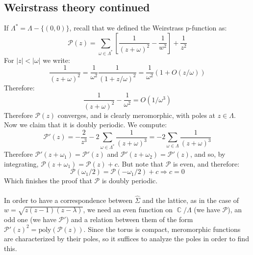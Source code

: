 \documentclass[12 pt]{article}
\DeclareMathOperator {\C} {\mathbb{C}}
\theoremstyle{plain}
\theoremstyle{definition}
\theoremstyle{remark}
\begin{document}
\subsection*{Weirstrass theory continued}
If $\Lambda^* = \Lambda - \{(0,0)\}$, recall that we defined the Weirstrass p-function as:
\[      \mathcal{P}(z) = \sum_{\omega \in \Lambda^*} \left[ \frac{1}{(z+\omega)^2} - \frac{1}{w^2}  \right]   + \frac{1}{z^2}     \]
For $|z| < |\omega|$ we write:
\[    \frac{1}{(z+\omega)^2} = \frac{1}{\omega^2} \frac{1}{(1 + z/\omega)^2}  = \frac{1}{\omega^2} (1 + O(z/\omega) )      \]
Therefore:
\[     \frac{1}{(z+\omega)^2} - \frac{1}{\omega^2}   = O (1/\omega^3)    \]
Therefore $\mathcal{P} (z)$ converges, and is clearly meromorphic, with poles at $z\in \Lambda$. Now we claim that it is doubly periodic. We compute:
\[      \mathcal{P}' (z) = - \frac{2}{z^3} - 2 \sum_{\omega \in \Lambda^*} \frac{1}{(z+\omega)^3} =  - 2 \sum_{\omega \in \Lambda} \frac{1}{(z+\omega)^3}  \]
Therefore $\mathcal{P}' (z + \omega_1) = \mathcal{P}' (z)$ and $\mathcal{P}' (z + \omega_2) = \mathcal{P}' (z)$, and so, by integrating, $\mathcal{P} (z + \omega_1) = \mathcal{P} (z) + c$. But note that $\mathcal{P}$ is even, and therefore:
\[      \mathcal{P}(\omega_1/2) =  \mathcal{P}(-\omega_1/2) + c  \Rightarrow c =0     \]
Which finishes the proof that $\mathcal{P}$ is doubly periodic.
\\
\\
In order to have a correspondence between $\hat \Sigma$ and the lattice, as in the case of $w = \sqrt{z(z-1)(z-\lambda)}$, we need an even function on $\C/\Lambda$ (we have $\mathcal{P}$), an odd one (we have $\mathcal{P}'$) and a relation between them of the form $\mathcal{P}' (z) ^2 = \text{poly} (\mathcal{P}(z) )$. Since the torus is compact, meromorphic functions are characterized by their poles, so it suffices to analyze the poles in order to find this.
\end{document}
